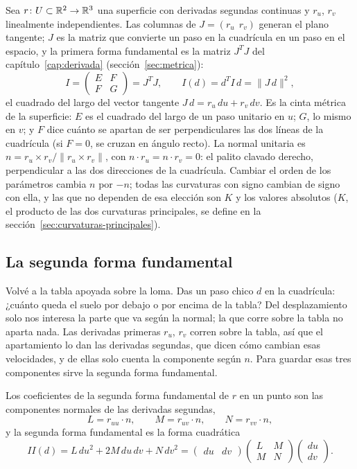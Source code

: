 Sea \(r\colon U\subset\mathbb{R}^2\to\mathbb{R}^3\) una superficie con derivadas segundas continuas y
\(r_u\), \(r_v\) linealmente independientes. Las columnas de \(J=(r_u\ \ r_v)\) generan el plano
tangente; \(J\) es la matriz que convierte un paso en la cuadrícula en un paso en el espacio, y
la primera forma fundamental es la matriz \(J^TJ\) del
capítulo~\ref{cap:derivada} (sección~\ref{sec:metrica}):
\[
  I=\begin{pmatrix}E&F\\F&G\end{pmatrix}=J^TJ,\qquad I(d)=d^TI\,d=\lVert J\,d\rVert^2 ,
\]
el cuadrado del largo del vector tangente \(J\,d=r_u\,du+r_v\,dv\). Es la cinta métrica de la
superficie: \(E\) es el cuadrado del largo de un paso unitario en \(u\); \(G\), lo mismo en
\(v\); y \(F\) dice cuánto se apartan de ser perpendiculares las dos líneas de la cuadrícula
(si \(F=0\), se cruzan en ángulo recto). La normal unitaria es
\(n=r_u\times r_v/\lVert r_u\times r_v\rVert\), con \(n\cdot r_u=n\cdot r_v=0\): el palito
clavado derecho, perpendicular a las dos direcciones de la cuadrícula.
Cambiar el orden de los parámetros cambia \(n\) por \(-n\); todas las curvaturas con signo
cambian de signo con ella, y las que no dependen de esa elección son \(K\) y los valores
absolutos (\(K\), el producto de las dos curvaturas principales, se define en la
sección~\ref{sec:curvaturas-principales}).

\subsection{La segunda forma fundamental}\label{sec:segunda-forma}

Volvé a la tabla apoyada sobre la loma. Das un paso chico \(d\) en la cuadrícula: ¿cuánto
queda el suelo por debajo o por encima de la tabla? Del desplazamiento solo nos interesa la
parte que va según la normal; la que corre sobre la tabla no aparta nada. Las derivadas
primeras \(r_u\), \(r_v\) corren sobre la tabla, así que el apartamiento lo dan las derivadas
segundas, que dicen cómo cambian esas velocidades, y de ellas solo cuenta la componente según
\(n\). Para guardar esas tres componentes sirve la segunda forma fundamental.

\begin{definicion}\label{def:segunda-forma}
Los coeficientes de la segunda forma fundamental de \(r\) en un punto son las componentes
normales de las derivadas segundas,
\[
  L=r_{uu}\cdot n,\qquad M=r_{uv}\cdot n,\qquad N=r_{vv}\cdot n,
\]
y la segunda forma fundamental es la forma cuadrática
\[
  II(d)=L\,du^2+2M\,du\,dv+N\,dv^2
  =\begin{pmatrix}du&dv\end{pmatrix}\begin{pmatrix}L&M\\M&N\end{pmatrix}
  \begin{pmatrix}du\\dv\end{pmatrix}.
\]
\end{definicion}

